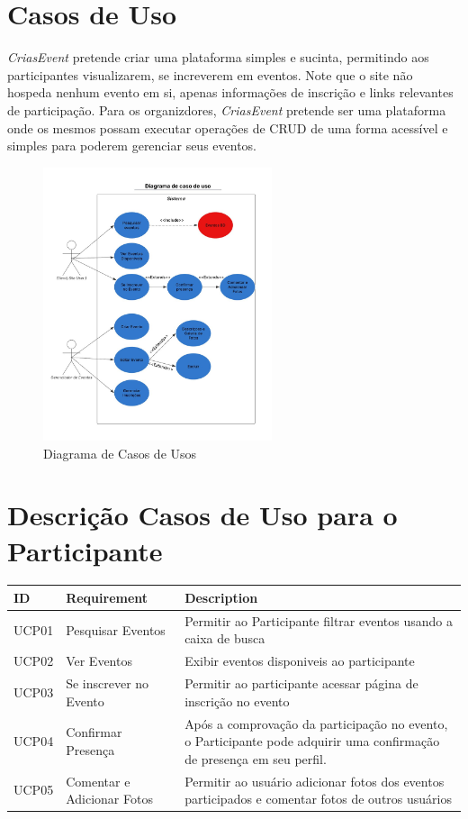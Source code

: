 \section{Casos de Uso}
\textit{CriasEvent} pretende criar uma plataforma simples e sucinta, permitindo aos participantes visualizarem, se increverem em eventos. Note que o site não hospeda nenhum evento em si, apenas informações de inscrição e links relevantes de participação. Para os organizdores, \textit{CriasEvent} pretende ser uma plataforma onde os mesmos possam executar operações de CRUD de uma forma acessível e simples para poderem gerenciar seus eventos.

\begin{figure}[h]
  \centering
  \includegraphics[width=0.6\textwidth]{images/user_case}
  \caption{Diagrama de Casos de Usos}
  \label{fig:diagram_user_case}
\end{figure}

\section{Descrição Casos de Uso para o Participante}
\begin{tabular}{>{\raggedright}p{1.5cm}>{\raggedright}p{4cm}>{\raggedright}p{10cm}}
\toprule
\textbf{ID} & \textbf{Requirement} & \textbf{Description} \tabularnewline 
\midrule
  UCP01 & Pesquisar Eventos & Permitir ao Participante filtrar eventos usando a caixa de busca\tabularnewline \hline
  UCP02 & Ver Eventos & Exibir eventos disponiveis ao participante\tabularnewline \hline
  UCP03 & Se inscrever no Evento & Permitir ao participante acessar página de inscrição no evento\tabularnewline \hline
  UCP04 & Confirmar Presença & Após a comprovação da participação no evento, o Participante pode adquirir uma confirmação de presença em seu perfil. \tabularnewline \hline
  UCP05 & Comentar e Adicionar Fotos & Permitir ao usuário adicionar fotos dos eventos participados e comentar fotos de outros usuários \tabularnewline
\bottomrule
\end{tabular}


